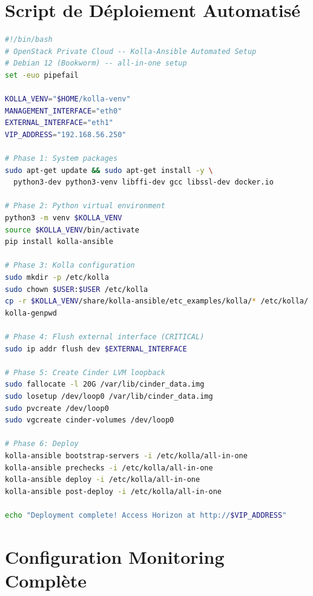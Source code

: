 \documentclass[12pt,a4paper,oneside]{book}
\begin{document}
\chapter{Script de D\'eploiement Automatis\'e}

\begin{lstlisting}[language=bash, caption={setup.sh -- Extrait du script de bootstrap (460 lignes)}]
#!/bin/bash
# OpenStack Private Cloud -- Kolla-Ansible Automated Setup
# Debian 12 (Bookworm) -- all-in-one setup
set -euo pipefail

KOLLA_VENV="$HOME/kolla-venv"
MANAGEMENT_INTERFACE="eth0"
EXTERNAL_INTERFACE="eth1"
VIP_ADDRESS="192.168.56.250"

# Phase 1: System packages
sudo apt-get update && sudo apt-get install -y \
  python3-dev python3-venv libffi-dev gcc libssl-dev docker.io

# Phase 2: Python virtual environment
python3 -m venv $KOLLA_VENV
source $KOLLA_VENV/bin/activate
pip install kolla-ansible

# Phase 3: Kolla configuration
sudo mkdir -p /etc/kolla
sudo chown $USER:$USER /etc/kolla
cp -r $KOLLA_VENV/share/kolla-ansible/etc_examples/kolla/* /etc/kolla/
kolla-genpwd

# Phase 4: Flush external interface (CRITICAL)
sudo ip addr flush dev $EXTERNAL_INTERFACE

# Phase 5: Create Cinder LVM loopback
sudo fallocate -l 20G /var/lib/cinder_data.img
sudo losetup /dev/loop0 /var/lib/cinder_data.img
sudo pvcreate /dev/loop0
sudo vgcreate cinder-volumes /dev/loop0

# Phase 6: Deploy
kolla-ansible bootstrap-servers -i /etc/kolla/all-in-one
kolla-ansible prechecks -i /etc/kolla/all-in-one
kolla-ansible deploy -i /etc/kolla/all-in-one
kolla-ansible post-deploy -i /etc/kolla/all-in-one

echo "Deployment complete! Access Horizon at http://$VIP_ADDRESS"
\end{lstlisting}


\chapter{Configuration Monitoring Compl\`ete}
\end{document}
